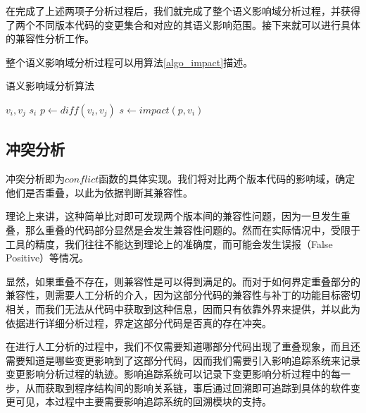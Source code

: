 %
%

在完成了上述两项子分析过程后，我们就完成了整个语义影响域分析过程，并获得了两个不同版本代码的变更集合和对应的其语义影响范围。接下来就可以进行具体的兼容性分析工作。

整个语义影响域分析过程可以用算法\ref {algo_impact}描述。

\begin{algorithm}[H]
	\caption{语义影响域分析算法}
	\label{algo_impact}
	\begin{algorithmic}[1]
		\Require $v_i,v_j$	
		\Ensure $s_i$
			\State $p \gets diff(v_i,v_j)$
			\State $s \gets impact(p,v_i)$
			\State{}
		\EndFunction
	\end{algorithmic}
\end{algorithm}

\subsection{冲突分析}

冲突分析即为$conflict$函数的具体实现。我们将对比两个版本代码的影响域，确定他们是否重叠，以此为依据判断其兼容性。

理论上来讲，这种简单比对即可发现两个版本间的兼容性问题，因为一旦发生重叠，那么重叠的代码部分显然是会发生兼容性问题的。然而在实际情况中，受限于工具的精度，我们往往不能达到理论上的准确度，而可能会发生误报（False Positive）等情况。

显然，如果重叠不存在，则兼容性是可以得到满足的。而对于如何界定重叠部分的兼容性，则需要人工分析的介入，因为这部分代码的兼容性与补丁的功能目标密切相关，而我们无法从代码中获取到这种信息，因而只有依靠外界来提供，并以此为依据进行详细分析过程，界定这部分代码是否真的存在冲突。

在进行人工分析的过程中，我们不仅需要知道哪部分代码出现了重叠现象，而且还需要知道是哪些变更影响到了这部分代码，因而我们需要引入影响追踪系统来记录变更影响分析过程的轨迹。影响追踪系统可以记录下变更影响分析过程中的每一步，从而获取到程序结构间的影响关系链，事后通过回溯即可追踪到具体的软件变更可见，本过程中主要需要影响追踪系统的回溯模块的支持。

